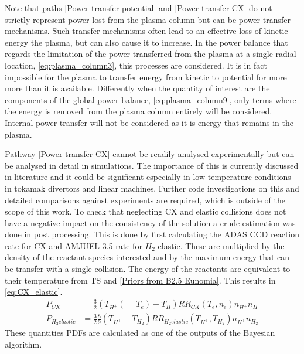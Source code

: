Note that paths \ref{Power transfer potential} and \ref{Power transfer CX} do not strictly represent power lost from the plasma column but can be power transfer mechanisms. Such transfer mechanisms often lead to an effective loss of kinetic energy the plasma, but can also cause it to increase. In the power balance that regards the limitation of the power transferred from the plasma at a single radial location, \autoref{eq:plasma_column3}, this processes are considered. It is in fact impossible for the plasma to transfer energy from kinetic to potential for more more than it is available. Differently when the quantity of interest are the components of the global power balance, \autoref{eq:plasma_column9}, only terms where the energy is removed from the plasma column entirely will be considered. Internal power transfer will not be considered as it is energy that remains in the plasma.

Pathway \ref{Power transfer CX} cannot be readily analysed experimentally but can be analysed in detail in simulations. The importance of this is currently discussed in literature and it could be significant especially in low temperature conditions in tokamak divertors and linear machines. \cite{Myatra2021,Smolders2020,Chandra2022} Further code investigations on this and detailed comparisons against experiments are required, which is outside of the scope of this work. To check that neglecting CX and elastic collisions does not have a negative impact on the consistency of the solution a crude estimation was done in post processing. This is done by first calculating the ADAS CCD reaction rate for CX and AMJUEL 3.5 rate for $H_2$ elastic. These are multiplied by the density of the reactant species interested and by the maximum energy that can be transfer with a single collision. The energy of the reactants are equivalent to their temperature from TS and \ref{Priors from B2.5 Eunomia}. This results in \autoref{eq:CX_elastic}.
\begin{equation}
\label{eq:CX_elastic}
\begin{aligned}
  P_{CX} &= \frac{ 3 }{ 2}  (T_{H^+}(=T_e)-T_H) RR_{CX}(T_e,n_e) n_{H^+} n_{H}
  \\
  P_{H_2 elastic} &= \frac{ 3 }{ 2} \frac{8}{9} (T_{H^+}-T_{H_2}) RR_{H_2 elastic}(T_{H^+},T_{H_2})  n_{H^+} n_{H_2}
\end{aligned}
\end{equation}
These quantities PDFs are calculated as one of the outputs of the Bayesian algorithm.

